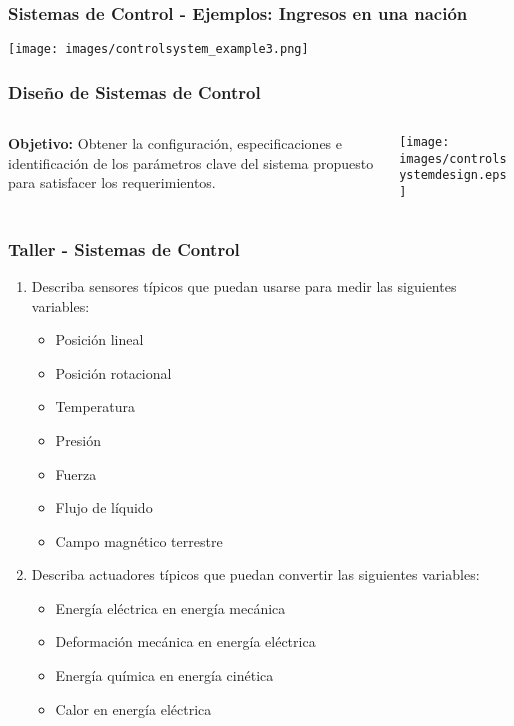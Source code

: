 \documentclass[aspectratio=169,handout]{beamer}
\theoremstyle{definition}
\theoremstyle{plain}
\theoremstyle{remark}
\newcounter{saveenumi}
\newcommand{\seti}{\setcounter{saveenumi}{\value{enumi}}}
\begin{document}
\begin{frame}[c]\frametitle{Sistemas de Control - Ejemplos: Ingresos en una nación}
  \begin{center}
    \texttt{[image: images/controlsystem\_example3.png]}
  \end{center}
\end{frame}

\begin{frame}[c]\frametitle{Diseño de Sistemas de Control}
  \begin{columns}
    \begin{column}{0.4\textwidth}
       \textbf{Objetivo:} Obtener la configuración, especificaciones e identificación de los parámetros clave del sistema propuesto para satisfacer los requerimientos.
    \end{column}
    \begin{column}{0.6\textwidth}
      \begin{center}
        \texttt{[image: images/controlsystemdesign.eps]}
      \end{center}
    \end{column}
  \end{columns}
\end{frame}

\begin{frame}[c]\frametitle{Taller - Sistemas de Control}
\begin{enumerate}
  \item Describa sensores típicos que puedan usarse para medir las siguientes variables:
  \begin{itemize}
    \item Posición lineal
    \item Posición rotacional
    \item Temperatura
    \item Presión
    \item Fuerza
    \item Flujo de líquido
    \item Campo magnético terrestre
  \end{itemize}
  \item Describa actuadores típicos que puedan convertir las siguientes variables:
  \begin{itemize}
    \item Energía eléctrica en energía mecánica
    \item Deformación mecánica en energía eléctrica
    \item Energía química en energía cinética
    \item Calor en energía eléctrica
  \end{itemize}
  \seti
\end{enumerate}
\end{frame}
\end{document}

